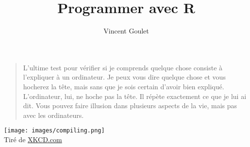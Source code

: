 \documentclass[letterpaper,11pt,x11names,english,french]{memoir}
\title{Programmer avec R}
\author{Vincent Goulet}
\theoremstyle{definition}
\newcounter{videos}[chapter]
\begin{document}
\frontmatter

\pagestyle{empty}


\null\cleartoverso              %


\clearpage

\pagestyle{companion}



\tableofcontents
\cleartorecto
\listoftables
\cleartorecto
\listoffigures
\cleartorecto
\listofvideos



\cleartorecto
\thispagestyle{empty}
\begin{vplace}[0.45]
  \begin{quote}
    L'ultime test pour vérifier si je comprends quelque chose
    consiste à l'expliquer à un ordinateur. Je peux vous dire quelque
    chose et vous hocherez la tête, mais sans que je sois certain d'avoir
    bien expliqué. L'ordinateur, lui, ne hoche pas la tête. Il répète
    exactement ce que je lui ai dit. Vous pouvez faire illusion dans
    plusieurs aspects de la vie, mais pas avec les ordinateurs.
  \end{quote}
\end{vplace}

\cleartoverso
\thispagestyle{empty}
\begin{vplace}[0.45]
  \centering
  \begin{minipage}{0.9\linewidth}
    \texttt{[image: images/compiling.png]} \\
    \footnotesize\sffamily%
    Tiré de \href{https://xkcd.com/303/}{XKCD.com}
  \end{minipage}
\end{vplace}

\mainmatter














\appendix






\cleardoublepage
{}
\printindex

\cleartoverso
\pagestyle{empty}


\cleartoverso

\end{document}
